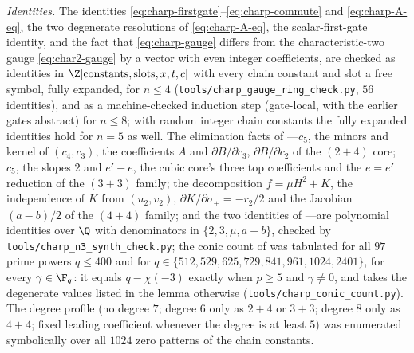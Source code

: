 \begin{remark}[Verification]
\label{rem:charp-verification}
\emph{Identities.}  The identities \eqref{eq:charp-firstgate}--\eqref{eq:charp-commute} and
\eqref{eq:charp-A-eq}, the two degenerate resolutions of \eqref{eq:charp-A-eq}, the
scalar-first-gate identity, and the fact that \eqref{eq:charp-gauge} differs from the
characteristic-two gauge \eqref{eq:char2-gauge} by a vector with even integer coefficients,
are checked as identities in $\Z[\text{constants},\text{slots},x,t,c]$ with every chain
constant and slot a free symbol, fully expanded, for $n\le4$
(\texttt{tools/}\allowbreak\texttt{charp\_gauge\_ring\_check.py}, $56$ identities), and as a machine-checked
induction step (gate-local, with the earlier gates abstract) for $n\le8$; with random
integer chain constants the fully expanded identities hold for $n=5$ as well.  The
elimination facts of ---$c_5$, the minors and kernel of $(c_4,c_3)$,
the coefficients $A$ and $\partial B/\partial c_3$, $\partial B/\partial c_2$ of the
$(2{+}4)$ core; $c_5$, the slopes $2$ and $e'-e$, the cubic core's three top coefficients
and the $e=e'$ reduction of the $(3{+}3)$ family; the decomposition $f=\mu H^2+K$, the
independence of $K$ from $(u_2,v_2)$, $\partial K/\partial\sigma_+=-r_2/2$ and the
Jacobian $(a-b)/2$ of the $(4{+}4)$ family; and the two identities of
---are polynomial identities over $\Q$ with denominators in
$\{2,3,\mu,a-b\}$, checked by \texttt{tools/}\allowbreak\texttt{charp\_n3\_synth\_check.py}; the conic count
of  was tabulated for all $97$ prime powers $q\le400$ and for
$q\in\{512,529,625,729,841,961,1024,2401\}$, for every $\gamma\in\F_q$: it equals
$q-\chi(-3)$ exactly when $p\ge5$ and $\gamma\neq0$, and takes the degenerate values listed
in the lemma otherwise (\texttt{tools/}\allowbreak\texttt{charp\_conic\_count.py}).  The
degree profile (no degree $7$; degree $6$ only as $2{+}4$ or $3{+}3$; degree $8$ only as
$4{+}4$; fixed leading coefficient whenever the degree is at least $5$) was enumerated
symbolically over all $1024$ zero patterns of the chain constants.


\end{remark}
